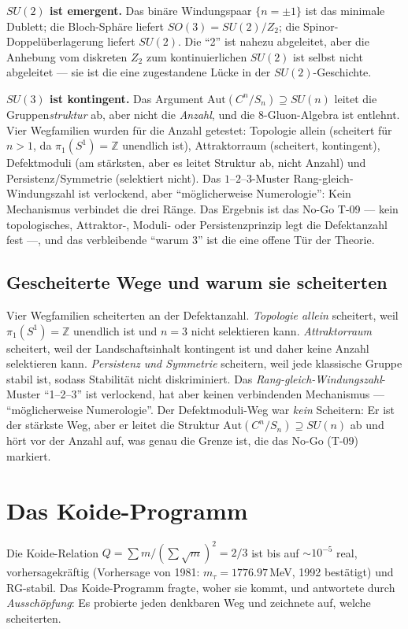 \documentclass[10pt,twoside,openany]{book}
\begin{document}
\textbf{$SU(2)$ ist emergent.} Das binäre Windungspaar $\{n=\pm1\}$ ist das minimale
Dublett; die Bloch-Sphäre liefert $SO(3)=SU(2)/Z_2$; die Spinor-Doppelüberlagerung
liefert $SU(2)$. Die ``2'' ist nahezu abgeleitet, aber die Anhebung vom diskreten $Z_2$
zum kontinuierlichen $SU(2)$ ist selbst nicht abgeleitet --- sie ist die eine
zugestandene Lücke in der $SU(2)$-Geschichte.

\textbf{$SU(3)$ ist kontingent.} Das Argument $\mathrm{Aut}(C^n/S_n)\supseteq SU(n)$
leitet die Gruppen\emph{struktur} ab, aber nicht die \emph{Anzahl}, und die
8-Gluon-Algebra ist entlehnt. Vier Wegfamilien wurden für die Anzahl getestet: Topologie
allein (scheitert für $n>1$, da $\pi_1(S^1)=\mathbb Z$ unendlich ist), Attraktorraum
(scheitert, kontingent), Defektmoduli (am stärksten, aber es leitet Struktur ab, nicht
Anzahl) und Persistenz/Symmetrie (selektiert nicht). Das $1$--$2$--$3$-Muster
Rang-gleich-Windungszahl ist verlockend, aber ``möglicherweise Numerologie'': Kein
Mechanismus verbindet die drei Ränge. Das Ergebnis ist das No-Go T-09 --- kein
topologisches, Attraktor-, Moduli- oder Persistenzprinzip legt die Defektanzahl fest ---,
und das verbleibende ``warum 3'' ist die eine offene Tür der Theorie.

\subsection{Gescheiterte Wege und warum sie scheiterten}

Vier Wegfamilien scheiterten an der Defektanzahl. \emph{Topologie allein} scheitert, weil
$\pi_1(S^1)=\mathbb Z$ unendlich ist und $n=3$ nicht selektieren kann. \emph{Attraktorraum}
scheitert, weil der Landschaftsinhalt kontingent ist und daher keine Anzahl selektieren
kann. \emph{Persistenz und Symmetrie} scheitern, weil jede klassische Gruppe stabil ist,
sodass Stabilität nicht diskriminiert. Das \emph{Rang-gleich-Windungszahl}-Muster
``1--2--3'' ist verlockend, hat aber keinen verbindenden Mechanismus --- ``möglicherweise
Numerologie''. Der Defektmoduli-Weg war \emph{kein} Scheitern: Er ist der stärkste Weg,
aber er leitet die Struktur $\mathrm{Aut}(C^n/S_n)\supseteq SU(n)$ ab und hört vor der
Anzahl auf, was genau die Grenze ist, die das No-Go (T-09) markiert.

\section{Das Koide-Programm}

Die Koide-Relation $Q=\sum m/(\sum\sqrt m)^2=2/3$ ist bis auf $\sim10^{-5}$ real,
vorhersagekräftig (Vorhersage von 1981: $m_\tau=1776.97$\,MeV, 1992 bestätigt) und
RG-stabil. Das Koide-Programm fragte, woher sie kommt, und antwortete durch
\emph{Ausschöpfung}: Es probierte jeden denkbaren Weg und zeichnete auf, welche
scheiterten.
\end{document}
